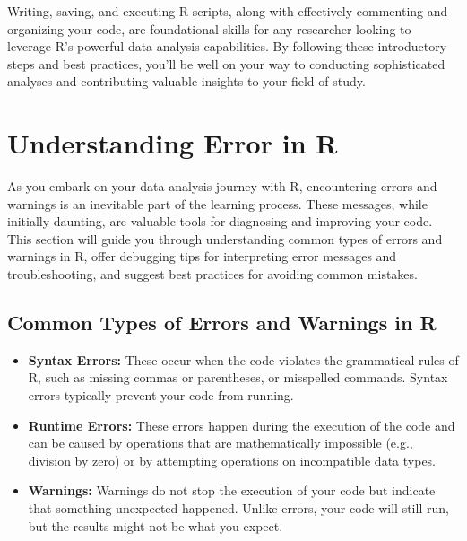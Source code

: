 \documentclass[
]{book}
\begin{document}
Writing, saving, and executing R scripts, along with effectively commenting and organizing your code, are foundational skills for any researcher looking to leverage R's powerful data analysis capabilities. By following these introductory steps and best practices, you'll be well on your way to conducting sophisticated analyses and contributing valuable insights to your field of study.

\hypertarget{understanding-error-in-r}{%
\section{Understanding Error in R}\label{understanding-error-in-r}}

As you embark on your data analysis journey with R, encountering errors and warnings is an inevitable part of the learning process. These messages, while initially daunting, are valuable tools for diagnosing and improving your code. This section will guide you through understanding common types of errors and warnings in R, offer debugging tips for interpreting error messages and troubleshooting, and suggest best practices for avoiding common mistakes.

\hypertarget{common-types-of-errors-and-warnings-in-r}{%
\subsection*{Common Types of Errors and Warnings in R}\label{common-types-of-errors-and-warnings-in-r}}

\begin{itemize}
\item
  \textbf{Syntax Errors:} These occur when the code violates the grammatical rules of R, such as missing commas or parentheses, or misspelled commands. Syntax errors typically prevent your code from running.
\item
  \textbf{Runtime Errors:} These errors happen during the execution of the code and can be caused by operations that are mathematically impossible (e.g., division by zero) or by attempting operations on incompatible data types.
\item
  \textbf{Warnings:} Warnings do not stop the execution of your code but indicate that something unexpected happened. Unlike errors, your code will still run, but the results might not be what you expect.
\end{itemize}
\end{document}
